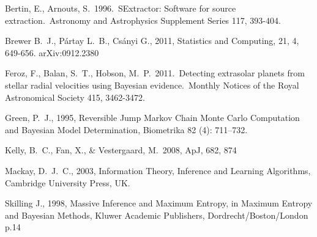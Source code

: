 \documentclass[letterpaper, 11pt]{article}
\begin{document}
\begin{thebibliography}{99}
 Bertin, E., Arnouts, S.\ 1996.\ SExtractor: Software for source extraction.\ Astronomy and Astrophysics Supplement Series 117, 393-404.

 Brewer B.~J., P{\'a}rtay L.~B.,
Cs{\'a}nyi G., 2011, Statistics and Computing, 21, 4, 649-656. arXiv:0912.2380

 Feroz, F., Balan, S.~T., 
Hobson, M.~P.\ 2011.\ Detecting extrasolar planets from stellar radial 
velocities using Bayesian evidence.\ Monthly Notices of the Royal 
Astronomical Society 415, 3462-3472. 

Green, P.~J., 1995, Reversible Jump Markov Chain Monte Carlo Computation and Bayesian Model Determination, Biometrika 82 (4): 711–732.

 Kelly, B.~C., Fan, X., 
\& Vestergaard, M.\ 2008, ApJ, 682, 874 

 Mackay, D.~J.~C., 2003, Information Theory,
Inference and Learning Algorithms, Cambridge University Press, UK.

Skilling J., 1998, Massive Inference and Maximum Entropy, in Maximum Entropy 
and Bayesian Methods, Kluwer Academic Publishers, Dordrecht/Boston/London p.14
\end{thebibliography}
\end{document}
